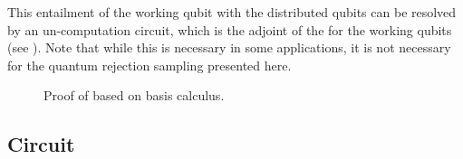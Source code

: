 This entailment of the working qubit with the distributed qubits can be resolved by an un-computation circuit, which is the adjoint of the \computationCircuit{} for the working qubits (see ).
Note that while this is necessary in some applications, it is not necessary for the quantum rejection sampling presented here.

%        

\begin{figure}
    \begin{center}
        
    \end{center}
    \caption{
        Proof of  based on basis calculus.
    }\label{fig:proofDecomposition}
\end{figure}



\subsection{Circuit \polynomialSparsity{}}

